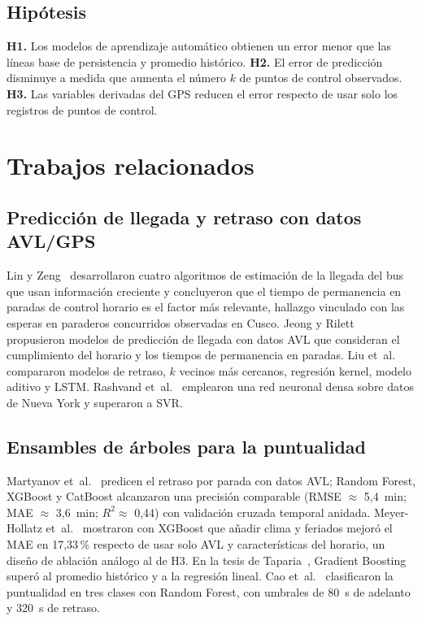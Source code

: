 \documentclass[conference]{IEEEtran}
\begin{document}
\subsection{Hipótesis}
\textbf{H1.} Los modelos de aprendizaje automático obtienen un error menor que las líneas base de persistencia y promedio histórico. \textbf{H2.} El error de predicción disminuye a medida que aumenta el número $k$ de puntos de control observados. \textbf{H3.} Las variables derivadas del GPS reducen el error respecto de usar solo los registros de puntos de control.

\section{Trabajos relacionados}\label{sec:rel}

\subsection{Predicción de llegada y retraso con datos AVL/GPS}
Lin y Zeng~\cite{lin1999} desarrollaron cuatro algoritmos de estimación de la llegada del bus que usan información creciente y concluyeron que el tiempo de permanencia en paradas de control horario es el factor más relevante, hallazgo vinculado con las esperas en paraderos concurridos observadas en Cusco. Jeong y Rilett~\cite{jeong2005} propusieron modelos de predicción de llegada con datos AVL que consideran el cumplimiento del horario y los tiempos de permanencia en paradas. Liu et~al.~\cite{liu2020} compararon modelos de retraso, $k$ vecinos más cercanos, regresión kernel, modelo aditivo y LSTM. Rashvand et~al.~\cite{rashvand2024} emplearon una red neuronal densa sobre datos de Nueva York y superaron a SVR.

\subsection{Ensambles de árboles para la puntualidad}
Martyanov et~al.~\cite{martyanov2026} predicen el retraso por parada con datos AVL; Random Forest, XGBoost y CatBoost alcanzaron una precisión comparable (RMSE $\approx$ 5,4~min; MAE $\approx$ 3,6~min; $R^2 \approx$ 0,44) con validación cruzada temporal anidada. Meyer-Hollatz et~al.~\cite{meyer2023} mostraron con XGBoost que añadir clima y feriados mejoró el MAE en 17,33\,\% respecto de usar solo AVL y características del horario, un diseño de ablación análogo al de H3. En la tesis de Taparia~\cite{taparia2020}, Gradient Boosting superó al promedio histórico y a la regresión lineal. Cao et~al.~\cite{cao2017} clasificaron la puntualidad en tres clases con Random Forest, con umbrales de 80~s de adelanto y 320~s de retraso.
\end{document}

